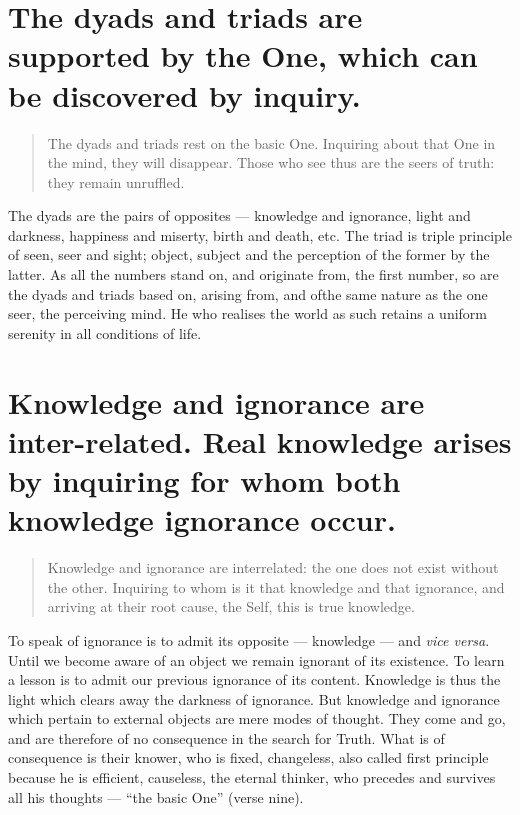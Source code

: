 \documentclass[12pt]{report}
\begin{document}
\section{ The dyads and triads are supported by the One, which can
  be discovered by inquiry.}

\begin{quote}
  The dyads and triads rest on the basic One. Inquiring about that One
  in the mind, they will disappear. Those who see thus are the seers of
  truth: they remain unruffled.
\end{quote}


The dyads are the pairs of opposites --- knowledge and ignorance,
light and darkness, happiness and miserty, birth and death, etc. The
triad is triple principle of seen, seer and sight; object, subject and
the perception of the former by the latter. As all the numbers stand
on, and originate from, the first number, so are the dyads and triads
based on, arising from, and ofthe same nature as the one seer, the
perceiving mind. He who realises the world as such retains a uniform
serenity in all conditions of life.


\section{ Knowledge and ignorance are inter-related. Real knowledge
arises by inquiring for whom both knowledge ignorance occur.}

\begin{quote}
  Knowledge and ignorance are interrelated: the one does not exist
  without the other. Inquiring to whom is it that knowledge and that
  ignorance, and arriving at their root cause, the Self, this is true
  knowledge. 
\end{quote}


To speak of ignorance is to admit its opposite --- knowledge --- and
\emph{vice versa}. Until we become aware of an object we remain
ignorant of its existence. To learn a lesson is to admit our previous
ignorance of its content. Knowledge is thus the light which clears
away the darkness of ignorance. But knowledge and ignorance which
pertain to external objects are mere modes of thought. They come and
go, and are therefore of no consequence in the search for Truth. What
is of consequence is their knower, who is fixed, changeless, also
called first principle because he is efficient, causeless, the eternal
thinker, who precedes and survives all his thoughts --- ``the basic
One'' (verse nine).
\end{document}
